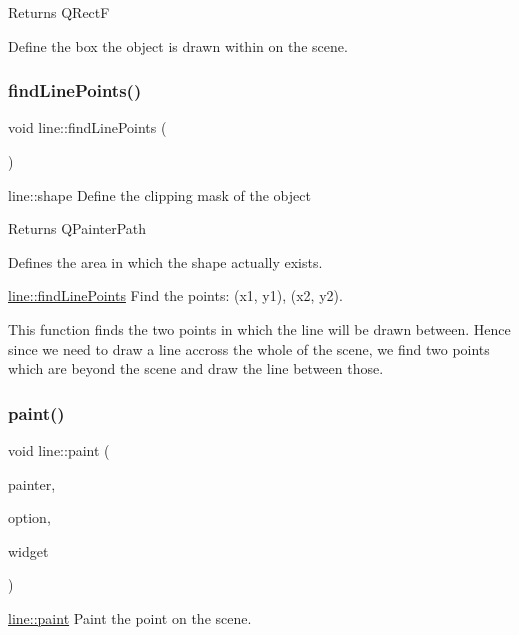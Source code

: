 \begin{DoxyReturn}{Returns}
Q\+RectF
\end{DoxyReturn}
Define the box the object is drawn within on the scene. \mbox{\label{classline_a0638608cbb7231dc4a55ea795e367748}} 
\subsubsection{\texorpdfstring{find\+Line\+Points()}{findLinePoints()}}
{\footnotesize\ttfamily void line\+::find\+Line\+Points (\begin{DoxyParamCaption}{ }\end{DoxyParamCaption})}



line\+::shape Define the clipping mask of the object 

\begin{DoxyReturn}{Returns}
Q\+Painter\+Path
\end{DoxyReturn}
Defines the area in which the shape actually exists.

\mbox{\hyperlink{classline_a0638608cbb7231dc4a55ea795e367748}{line\+::find\+Line\+Points}} Find the points\+: (x1, y1), (x2, y2).

This function finds the two points in which the line will be drawn between. Hence since we need to draw a line accross the whole of the scene, we find two points which are beyond the scene and draw the line between those. \mbox{\label{classline_a128cee38b49baa22b618165edc900e81}} 
\subsubsection{\texorpdfstring{paint()}{paint()}}
{\footnotesize\ttfamily void line\+::paint (\begin{DoxyParamCaption}\item[{Q\+Painter $\ast$}]{painter,  }\item[{const Q\+Style\+Option\+Graphics\+Item $\ast$}]{option,  }\item[{Q\+Widget $\ast$}]{widget }\end{DoxyParamCaption})}



\mbox{\hyperlink{classline_a128cee38b49baa22b618165edc900e81}{line\+::paint}} Paint the point on the scene. 


